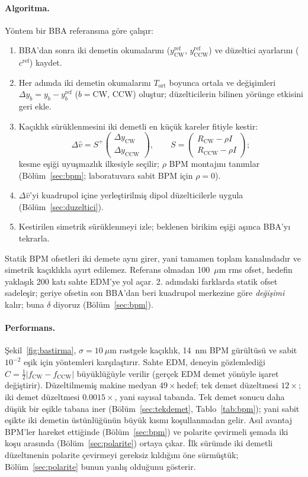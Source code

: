 \documentclass[11pt,a4paper]{article}
\begin{document}
\paragraph{Algoritma.} Yöntem bir BBA referansına göre çalışır:
\begin{enumerate}[nosep]
\item BBA'dan sonra iki demetin okumalarını ($y^\text{ref}_\text{CW}$, $y^\text{ref}_\text{CCW}$) ve düzeltici
ayarlarını ($c^\text{ref}$) kaydet.
\item Her adımda iki demetin okumalarını $T_\text{ort}$ boyunca ortala ve değişimleri
$\Delta y_b=y_b-y^\text{ref}_b$ ($b=$CW, CCW) oluştur; düzelticilerin bilinen yörünge etkisini geri ekle.
\item Kaçıklık sürüklenmesini iki demetli en küçük kareler fitiyle kestir:
\begin{equation}
\Delta\hat v=S^+\begin{pmatrix}\Delta y_\text{CW}\\\Delta y_\text{CCW}\end{pmatrix},\qquad
S=\begin{pmatrix}R_\text{CW}-\rho I\\R_\text{CCW}-\rho I\end{pmatrix};
\label{eq:fit}
\end{equation}
kesme eşiği uyuşmazlık ilkesiyle seçilir; $\rho$ BPM montajını tanımlar (Bölüm~\ref{sec:bpm}; laboratuvara
sabit BPM için $\rho=0$).
\item $\Delta\hat v$'yi kuadrupol içine yerleştirilmiş dipol düzelticilerle uygula (Bölüm~\ref{sec:duzeltici}).
\item Kestirilen simetrik sürüklenmeyi izle; beklenen birikim eşiği aşınca BBA'yı tekrarla.
\end{enumerate}
Statik BPM ofsetleri iki demete aynı girer, yani tamamen toplam kanalındadır ve simetrik kaçıklıkla ayırt
edilemez. Referans olmadan 100~$\mu$m rms ofset, hedefin yaklaşık 200 katı sahte EDM'ye yol açar. 2. adımdaki
farklarda statik ofset sadeleşir; geriye ofsetin son BBA'dan beri kuadrupol merkezine göre \emph{değişimi}
kalır; buna $\delta$ diyoruz (Bölüm~\ref{sec:bpm}).

\paragraph{Performans.} Şekil~\ref{fig:bastirma}, $\sigma=10~\mu$m rastgele kaçıklık, 14~nm BPM gürültüsü ve
sabit $10^{-2}$ eşik için yöntemleri karşılaştırır. Sahte EDM, deneyin gözlemlediği
$C=\tfrac12|f_\text{CW}-f_\text{CCW}|$ büyüklüğüyle verilir (gerçek EDM demet yönüyle işaret değiştirir).
Düzeltilmemiş makine medyan $49\times$hedef; tek demet düzeltmesi $12\times$; iki demet düzeltmesi
$0.0015\times$, yani sayısal tabanda. Tek demet sonucu daha düşük bir eşikle tabana iner
(Bölüm~\ref{sec:tekdemet}, Tablo~\ref{tab:bpm}); yani sabit eşikte iki demetin üstünlüğünün büyük kısmı
koşullanmadan gelir. Asıl avantaj BPM'ler hareket ettiğinde (Bölüm~\ref{sec:bpm}) ve polarite çevirmeli şemada iki koşu arasında
(Bölüm~\ref{sec:polarite}) ortaya çıkar. İlk sürümde iki demetli düzeltmenin polarite çevirmeyi gereksiz
kıldığını öne sürmüştük; Bölüm~\ref{sec:polarite} bunun yanlış olduğunu gösterir.
\end{document}
